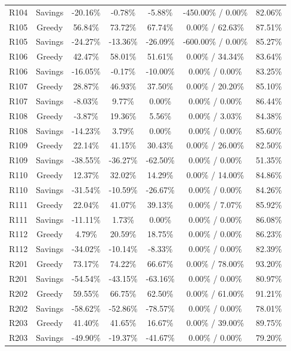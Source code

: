\documentclass[conference]{IEEEtran}
\begin{document}
\begin{table}[htbp]
{\begin{tabular}{lcccccc}
R104 & Savings & -20.16\% & -0.78\% & -5.88\% & -450.00\% / 0.00\% & 82.06\% \\
R105 & Greedy & 56.84\% & 73.72\% & 67.74\% & 0.00\% / 62.63\% & 87.51\% \\
R105 & Savings & -24.27\% & -13.36\% & -26.09\% & -600.00\% / 0.00\% & 85.27\% \\
R106 & Greedy & 42.47\% & 58.01\% & 51.61\% & 0.00\% / 34.34\% & 83.64\% \\
R106 & Savings & -16.05\% & -0.17\% & -10.00\% & 0.00\% / 0.00\% & 83.25\% \\
R107 & Greedy & 28.87\% & 46.93\% & 37.50\% & 0.00\% / 20.20\% & 85.10\% \\
R107 & Savings & -8.03\% & 9.77\% & 0.00\% & 0.00\% / 0.00\% & 86.44\% \\
R108 & Greedy & -3.87\% & 19.36\% & 5.56\% & 0.00\% / 3.03\% & 84.38\% \\
R108 & Savings & -14.23\% & 3.79\% & 0.00\% & 0.00\% / 0.00\% & 85.60\% \\
R109 & Greedy & 22.14\% & 41.15\% & 30.43\% & 0.00\% / 26.00\% & 82.50\% \\
R109 & Savings & -38.55\% & -36.27\% & -62.50\% & 0.00\% / 0.00\% & 51.35\% \\
R110 & Greedy & 12.37\% & 32.02\% & 14.29\% & 0.00\% / 14.00\% & 84.86\% \\
R110 & Savings & -31.54\% & -10.59\% & -26.67\% & 0.00\% / 0.00\% & 84.26\% \\
R111 & Greedy & 22.04\% & 41.07\% & 39.13\% & 0.00\% / 7.07\% & 85.92\% \\
R111 & Savings & -11.11\% & 1.73\% & 0.00\% & 0.00\% / 0.00\% & 86.08\% \\
R112 & Greedy & 4.79\% & 20.59\% & 18.75\% & 0.00\% / 0.00\% & 86.23\% \\
R112 & Savings & -34.02\% & -10.14\% & -8.33\% & 0.00\% / 0.00\% & 82.39\% \\
R201 & Greedy & 73.17\% & 74.22\% & 66.67\% & 0.00\% / 78.00\% & 93.20\% \\
R201 & Savings & -54.54\% & -43.15\% & -63.16\% & 0.00\% / 0.00\% & 80.97\% \\
R202 & Greedy & 59.55\% & 66.75\% & 62.50\% & 0.00\% / 61.00\% & 91.21\% \\
R202 & Savings & -58.62\% & -52.86\% & -78.57\% & 0.00\% / 0.00\% & 78.01\% \\
R203 & Greedy & 41.40\% & 41.65\% & 16.67\% & 0.00\% / 39.00\% & 89.75\% \\
R203 & Savings & -49.90\% & -19.37\% & -41.67\% & 0.00\% / 0.00\% & 79.20\% \\

\end{tabular}}
\end{table}
\end{document}
